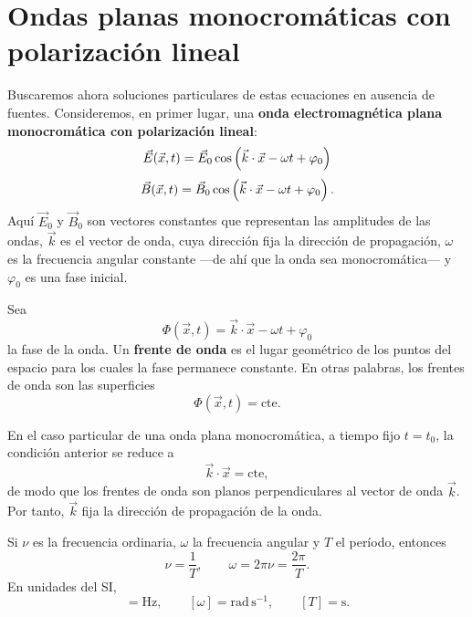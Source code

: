 \documentclass[../main.tex]{subfiles}
\begin{document}
\section{Ondas planas monocromáticas con polarización lineal}

Buscaremos ahora soluciones particulares de estas ecuaciones en ausencia de fuentes. Consideremos, en primer lugar, una \textbf{onda electromagnética plana monocromática con polarización lineal}:
\begin{equation*}
    \vec{E}(\vec x,t)= \vec E_0\cos\left(\vec k\cdot \vec x -\omega t+\varphi_0\right)
\end{equation*}
\begin{equation*}
    \vec{B}(\vec x,t)= \vec B_0\cos\left(\vec k\cdot \vec x -\omega t+\varphi_0\right).
\end{equation*}
Aquí $\vec E_0$ y $\vec B_0$ son vectores constantes que representan las amplitudes de las ondas, $\vec k$ es el vector de onda, cuya dirección fija la dirección de propagación, $\omega$ es la frecuencia angular constante ---de ahí que la onda sea monocromática--- y $\varphi_0$ es una fase inicial.



Sea
\begin{equation*}
    \Phi(\vec x,t)=\vec k\cdot \vec x-\omega t+\varphi_0
\end{equation*}
la fase de la onda. Un \textbf{frente de onda} es el lugar geométrico de los puntos del espacio para los cuales la fase permanece constante. En otras palabras, los frentes de onda son las superficies
\begin{equation*}
    \Phi(\vec x,t)=\text{cte}.
\end{equation*}

En el caso particular de una onda plana monocromática, a tiempo fijo $t=t_0$, la condición anterior se reduce a
\begin{equation*}
    \vec k\cdot \vec x=\text{cte},
\end{equation*}
de modo que los frentes de onda son planos perpendiculares al vector de onda $\vec k$. Por tanto, $\vec k$ fija la dirección de propagación de la onda.

Si $\nu$ es la frecuencia ordinaria, $\omega$ la frecuencia angular y $T$ el período, entonces
\begin{equation*}
    \nu=\frac{1}{T},
    \qquad
    \omega=2\pi \nu=\frac{2\pi}{T}.
\end{equation*}
En unidades del SI,
\begin{equation*}
    [\nu]=\mathrm{Hz},
    \qquad
    [\omega]=\mathrm{rad\,s^{-1}},
    \qquad
    [T]=\mathrm{s}.
\end{equation*}
\end{document}
